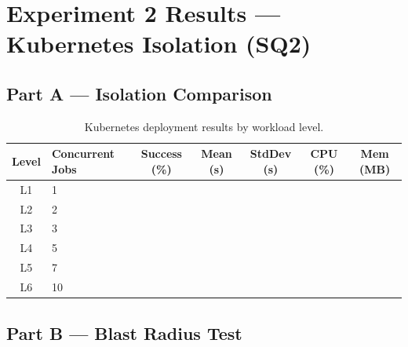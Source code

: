 
\section{Experiment 2 Results --- Kubernetes Isolation (SQ2)}
\label{sec:results-exp2}


\subsection{Part A --- Isolation Comparison}
\label{subsec:results-exp2a}

\begin{table}[H]
  \centering
  \caption{Kubernetes deployment results by workload level.}
  \label{tab:results-k8s}
  \small
  \begin{tabular}{clccccc}
    \toprule
    \textbf{Level} & \textbf{Concurrent Jobs} & \textbf{Success (\%)} & \textbf{Mean (s)} & \textbf{StdDev (s)} & \textbf{CPU (\%)} & \textbf{Mem (MB)} \\
    \midrule
    L1 & 1  & & & & & \\
    L2 & 2  & & & & & \\
    L3 & 3  & & & & & \\
    L4 & 5  & & & & & \\
    L5 & 7  & & & & & \\
    L6 & 10 & & & & & \\
    \bottomrule
  \end{tabular}
\end{table}


\subsection{Part B --- Blast Radius Test}
\label{subsec:results-exp2b}


